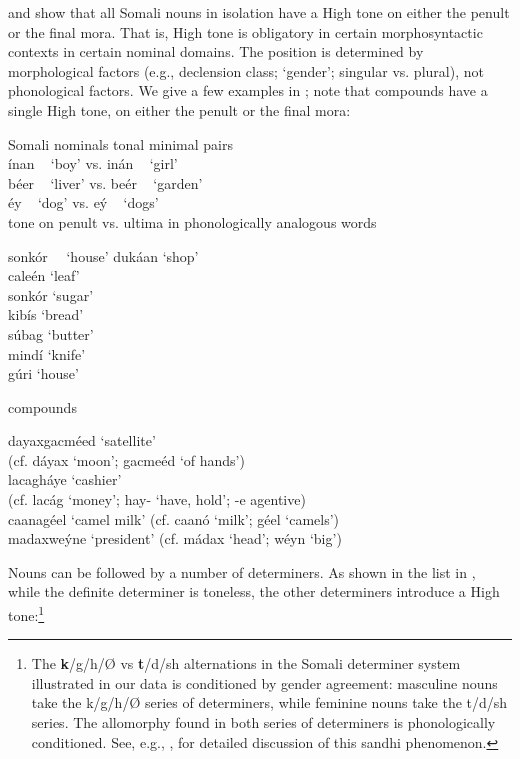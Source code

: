 \documentclass[output=paper]{langscibook}
\begin{document}
\citet{Hyman1981,Saeed1993,Saeed1999} and \citet{Green2016} show that all Somali nouns in isolation have a High tone on either the penult or the final mora. That is, High tone is obligatory in certain morphosyntactic contexts in certain nominal domains. The position is determined by morphological factors (e.g., declension class; ‘gender’; singular vs. plural), not phonological factors. We give a few examples in ; note that compounds have a single High tone, on either the penult or the final mora:
 
\ea  Somali nominals \label{ex:downing:1}
  \ea tonal minimal pairs \label{ex:downing:1a}\\
  ínan ~ \textup{‘boy’  vs.}   inán   ~ \textup{‘girl’}\\
  béer  ~ \textup{‘liver’  vs.}  beér ~ \textup{‘garden’}\\
  éy ~ \textup{‘dog’  vs.}  eý ~ \textup{‘dogs’}\\

  \ex tone on penult vs. ultima in phonologically analogous words\label{ex:downing:1b}\\

  \begin{tabbing}
  sonkór~~ \= \textup{‘house’}\kill
  dukáan \> \textup{‘shop’}\\
  caleén \> \textup{‘leaf’}\\
  sonkór \> \textup{‘sugar’}\\
  kibís \> \textup{‘bread’}\\
  súbag \> \textup{‘butter’}\\
  mindí \> \textup{‘knife’}\\
  gúri \> \textup{‘house’}
  \end{tabbing}

  \ex compounds \label{ex:downing:1c}

  dayaxgacméed \textup{‘satellite’ \\
    (cf.} dáyax \textup{‘moon’;} gacmeéd \textup{‘of hands’)}\\
  lacagháye \textup{‘cashier’ \\
    (cf.} lacág \textup{‘money’;} hay- \textup{‘have, hold’;} -e \textup{agentive)}\\
  caanagéel \textup{‘camel milk’ (cf.} caanó \textup{‘milk’;} géel \textup{‘camels’)}\\
  madaxweýne \textup{‘president’ (cf.} mádax \textup{‘head’;} wéyn \textup{‘big’)}\\
  \z
\z

Nouns can be followed by a number of determiners. As shown in the list in , while the definite determiner is toneless, the other determiners introduce a High tone:\footnote{The \textbf{k}/g/h/Ø vs \textbf{t}/d/sh alternations in the Somali determiner system illustrated in our data is conditioned by gender agreement: masculine nouns take the k/g/h/Ø series of determiners, while feminine nouns take the t/d/sh series. The allomorphy found in both series of determiners is phonologically conditioned. See, e.g., \citet{Saeed1993,Saeed1999}, for detailed discussion of this sandhi phenomenon.}
\end{document}
